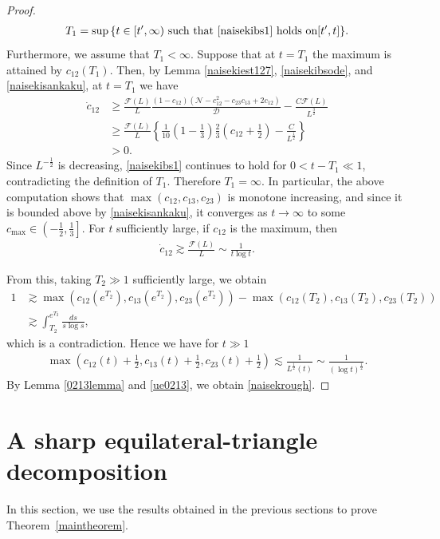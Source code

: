 \documentclass[reqno]{amsart}
\theoremstyle{plain}
\theoremstyle{definition}
\numberwithin{equation}{section}
\newcommand{\1}{\mathbbm{1}}
\begin{document}
\begin{proof}
\begin{align}\label{bs1sono3}
T_1=\sup{\{t\in[t^{\prime},\infty) \ \mbox{such that \eqref{naisekibs1} holds on} [t^{\prime},t]\}}.
\end{align}
Furthermore, we assume that $T_1<\infty$. Suppose that at $t=T_1$ the maximum is attained by $c_{12}(T_1)$.
Then, by Lemma \ref{naisekiest127}, \eqref{naisekibsode}, and \eqref{naisekisankaku}, at $t=T_1$ we have
\begin{align*}
\dot{c}_{12}&\geq \frac{\mathcal{F}(L)}{L}\frac{(1-c_{12})(\mathcal{N}-c_{12}^2-c_{23}c_{13}+2c_{12})}{\mathcal{D}}- \frac{C\mathcal{F}(L)}{L^{\frac{3}{2}}}
\\
&\geq \frac{\mathcal{F}(L)}{L}\left\{ \frac{1}{10}\left(1-\frac{1}{3}\right)\frac{2}{3}\left(c_{12}+\frac{1}{2}\right)-\frac{C}{L^{\frac{1}{2}}}\right\}
\\
&>0.
\end{align*}
Since $L^{-\frac{1}{2}}$ is decreasing, \eqref{naisekibs1} continues to hold for $0<t-T_1\ll 1$, contradicting the definition of $T_1$. Therefore $T_1=\infty$. In particular, the above computation shows that $\max(c_{12},c_{13},c_{23})$ is monotone increasing, and since it is bounded above by \eqref{naisekisankaku}, it converges as $t\to\infty$ to some $c_{\max}\in\left(-\frac{1}{2},\frac{1}{3}\right]$.
For $t$ sufficiently large, if $c_{12}$ is the maximum, then
\begin{align*}
\dot{c}_{12}\gtrsim \frac{\mathcal{F}(L)}{L}\sim \frac{1}{t\log{t}}.
\end{align*}


From this, taking $T_2\gg 1$ sufficiently large, we obtain
\begin{align*}
1&\gtrsim \max{(c_{12}(e^{T_2}),c_{13}(e^{T_2}),c_{23}(e^{T_2}))}-\max{(c_{12}(T_2),c_{13}(T_2),c_{23}(T_2))}
\\
&\gtrsim \int_{T_2}^{e^{T_2}} \frac{ds}{s\log{s}},
\end{align*}
which is a contradiction. Hence we have for $t\gg 1$
\begin{align}\label{ue0213}
\max{\left(c_{12}(t)+\frac{1}{2},c_{13}(t)+\frac{1}{2},c_{23}(t)+\frac{1}{2}\right)}\lesssim \frac{1}{L^{\frac{1}{2}}(t)}\sim \frac{1}{(\log{t})^{\frac{1}{2}}}.
\end{align}
By Lemma \ref{0213lemma} and \eqref{ue0213}, we obtain \eqref{naisekrough}.
\end{proof}



\section{A sharp equilateral-triangle decomposition}
In this section, we use the results obtained in the previous sections to prove Theorem~\ref{maintheorem}.
\end{document}
